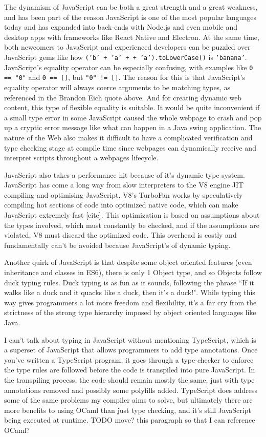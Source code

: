 \documentclass[12pt,a4paper,twoside,openright]{report}
\begin{document}
The dynamism of JavaScript can be both a great strength and a great weakness, and has been part of the reason JavaScript is one of the most popular languages today and has expanded into back-ends with Node.js and even mobile and desktop apps with frameworks like React Native and Electron.
At the same time, both newcomers to JavaScript and experienced developers can be puzzled over JavaScript gems like how \mbox{\tt ('b' + 'a' + + 'a').toLowerCase()} is {\tt 'banana'}.
JavaScript's equality operator can be especially confusing, with examples like {\tt 0 == "0"} and {\tt 0 == []}, but {\tt "0" != []}.
The reason for this is that JavaScript's equality operator will always coerce arguments to be matching types, as referenced in the Brandon Eich quote above.
And for creating dynamic web content, this type of flexible equality is suitable.
It would be quite inconvenient if a small type error in some JavaScript caused the whole webpage to crash and pop up a cryptic error message like what can happen in a Java swing application.
The nature of the Web also makes it difficult to have a complicated verification and type checking stage at compile time since webpages can dynamically receive and interpret scripts throughout a webpages lifecycle.

JavaScript also takes a performance hit because of it's dynamic type system.
JavaScript has come a long way from slow interpreters to the V8 engine JIT compiling and optimising JavaScript.
V8's TurboFan works by speculatively compiling hot sections of code into optimized native code, which can make JavaScript extremely fast [cite].
This optimization is based on assumptions about the types involved, which must constantly be checked, and if the assumptions are violated, V8 must discard the optimized code.
This overhead is costly and fundamentally can't be avoided because JavaScript's of dynamic typing.

Another quirk of JavaScript is that despite some object oriented features (even inheritance and classes in ES6), there is only 1 Object type, and so Objects follow duck typing rules.
Duck typing is as fun as it sounds, following the phrase ``If it walks like a duck and it quacks like a duck, then it's a duck!".
While typing this way gives programmers a lot more freedom and flexibility, it's a far cry from the strictness of the strong type hierarchy imposed by object oriented languages like Java.

I can't talk about typing in JavaScript without mentioning TypeScript, which is a superset of JavaScript that allows programmers to add type annotations.
Once you've written a TypeScript program, it goes through a type-checker to enforce the type rules are followed before the code is transpiled into pure JavaScript.
In the transpiling process, the code should remain mostly the same, just with type annotations removed and possibly some polyfills added.
TypeScript does address some of the same problems my compiler aims to solve, but ultimately there are more benefits to using OCaml than just type checking, and it's still JavaScript being executed at runtime.
TODO move? this paragraph so that I can reference OCaml?
\end{document}

